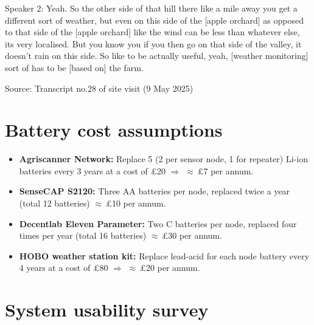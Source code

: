Speaker 2: Yeah. So the other side of that hill there like a mile away you get a
different sort of weather, but even on this side of the [apple orchard] as
opposed to that side of the [apple orchard] like the wind can be less than
whatever else, its very localised. But you know you if you then go on that side
of the valley, it doesn't rain on this side. So like to be actually useful,
yeah, [weather monitoring] sort of has to be [based on] the farm.

Source: Transcript no.28 of site visit (9 May 2025)

\section{Battery cost assumptions}\label{app:battery-assumptions}
\begin{itemize}
  \item \textbf{Agriscanner Network:} Replace 5 (2 per sensor node, 1 for
  repeater) Li-ion batteries every 3 years at a cost of \pounds{}20
  \(\Rightarrow\) \(\approx\)\,\pounds{}7 per annum.
  \item \textbf{SenseCAP S2120:} Three AA batteries per node, replaced twice a
  year (total 12 batteries) \(\approx\)\,\pounds{}10 per annum.
  \item \textbf{Decentlab Eleven Parameter:} Two C batteries per node, replaced
  four times per year (total 16 batteries) \(\approx\)\,\pounds{}30 per annum.
  \item \textbf{HOBO weather station kit:} Replace lead-acid for each node
  battery every 4 years at a cost of \pounds{}80 \(\Rightarrow\)
  \(\approx\)\,\pounds{}20 per annum.
\end{itemize}

\section{System usability survey}\label{app:sus-survey}


